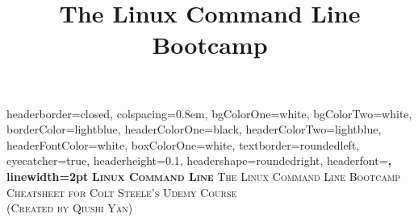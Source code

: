 \documentclass[landscape,a0paper,fontscale=0.285]{baposter} %
\title{The Linux Command Line Bootcamp}
\begin{document}
\begin{poster}
{
headerborder=closed, %
colspacing=0.8em, %
bgColorOne=white, %
bgColorTwo=white, %
borderColor=lightblue, %
headerColorOne=black, %
headerColorTwo=lightblue, %
headerFontColor=white, %
boxColorOne=white, %
textborder=roundedleft, %
eyecatcher=true, %
headerheight=0.1\textheight, %
headershape=roundedright, %
headerfont=\Large\bf\textsc, %
linewidth=2pt %
}
{\bf\textsc{Linux Command Line}\vspace{0.5em}} %
{\textsc{The Linux Command Line Bootcamp \hspace{12pt}}}
{\textsc{Cheatsheet for Colt Steele's Udemy Course \\ (Created by Qiushi Yan) \hspace{12pt}}}



\end{poster}
\end{document}
